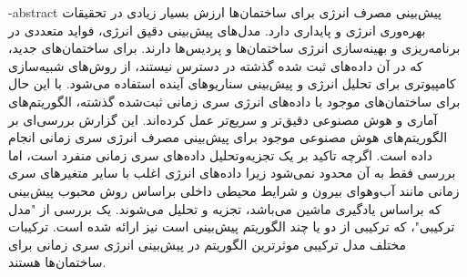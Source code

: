 \department{}

\fa-abstract{
    پیش‌بینی مصرف انرژی برای ساختمان‌ها ارزش بسیار زیادی در تحقیقات بهره‌وری انرژی و پایداری دارد. مدل‌های پیش‌بینی دقیق انرژی، فواید متعددی در برنامه‌ریزی
     و بهینه‌سازی انرژی ساختمان‌ها و پردیس‌ها دارند. برای ساختمان‌های جدید، 
    که در آن داده‌های ثبت شده گذشته در دسترس نیستند، از روش‌های شبیه‌سازی کامپیوتری برای تحلیل انرژی و پیش‌بینی سناریوهای آینده استفاده می‌شود.
    با این‌ حال برای ساختمان‌های موجود با داده‌های انرژی سری زمانی ثبت‌شده گذشته، الگوریتم‌های آماری و هوش مصنوعی دقیق‌تر و سریع‌تر عمل کرده‌اند. 
    این گزارش بررسی‌ای بر الگوریتم‌های هوش مصنوعی موجود برای پیش‌بینی مصرف انرژی سری زمانی انجام داده است.
     اگرچه تاکید بر یک تجزیه‌و‌تحلیل داده‌های سری زمانی منفرد است، اما بررسی فقط به آن محدود نمی‌شود زیرا داده‌های انرژی 
     اغلب با سایر متغیرهای سری زمانی مانند آب‌و‌هوای بیرون و شرایط محیطی داخلی براساس روش محبوب پیش‌بینی که براساس یادگیری ماشین می‌باشد، تجزیه و تحلیل می‌شوند. 
      یک بررسی از "مدل ترکیبی"، که ترکیبی از دو یا چند الگوریتم پیش‌بینی است نیز ارائه شده است.
      ترکیبات مختلف مدل ترکیبی موثرترین الگوریتم در پیش‌بینی انرژی سری زمانی برای ساختمان‌ها هستند.
}




\vspace*{7cm}
\thispagestyle{empty}
\begin{center}

\end{center}